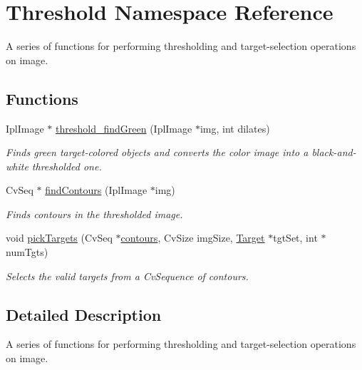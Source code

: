 \hypertarget{namespaceThreshold}{
\section{Threshold Namespace Reference}
\label{namespaceThreshold}
}


A series of functions for performing thresholding and target-\/selection operations on image.  


\subsection*{Functions}
\begin{DoxyCompactItemize}
\item 
IplImage $\ast$ \hyperlink{namespaceThreshold_a7b9d70b26f11d21f8eb737512c502fdf}{threshold\_\-findGreen} (IplImage $\ast$img, int dilates)
\begin{DoxyCompactList}\small\item\em Finds green target-\/colored objects and converts the color image into a black-\/and-\/white thresholded one. \item\end{DoxyCompactList}\item 
CvSeq $\ast$ \hyperlink{namespaceThreshold_aa7e5d8d44e549fadc62258d6fd18b988}{findContours} (IplImage $\ast$img)
\begin{DoxyCompactList}\small\item\em Finds contours in the thresholded image. \item\end{DoxyCompactList}\item 
void \hyperlink{namespaceThreshold_a71ea4886f013bfadb7386d7b5ad88661}{pickTargets} (CvSeq $\ast$\hyperlink{main_8cpp_abda9aa51226269d37735e140998e8320}{contours}, CvSize imgSize, \hyperlink{classTarget}{Target} $\ast$tgtSet, int $\ast$numTgts)
\begin{DoxyCompactList}\small\item\em Selects the valid targets from a CvSequence of contours. \item\end{DoxyCompactList}\end{DoxyCompactItemize}


\subsection{Detailed Description}
A series of functions for performing thresholding and target-\/selection operations on image. 

